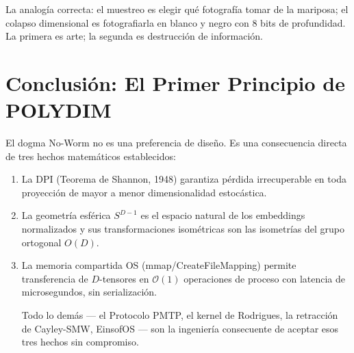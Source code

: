 La analogía correcta: el muestreo es elegir qué fotografía tomar de la mariposa;
el colapso dimensional es fotografiarla en blanco y negro con 8 bits de profundidad.
La primera es arte; la segunda es destrucción de información.

\section{Conclusión: El Primer Principio de POLYDIM}

El dogma No-Worm no es una preferencia de diseño. Es una consecuencia directa
de tres hechos matemáticos establecidos:

\begin{enumerate}
\item La DPI (Teorema de Shannon, 1948) garantiza pérdida irrecuperable en toda
proyección de mayor a menor dimensionalidad estocástica.

\item La geometría esférica $S^{D-1}$ es el espacio natural de los embeddings
normalizados y sus transformaciones isométricas son las isometrías del grupo
ortogonal $O(D)$.

\item La memoria compartida OS (mmap/CreateFileMapping) permite transferencia
de $D$-tensores en $\mathcal{O}(1)$ operaciones de proceso con latencia de
microsegundos, sin serialización.

Todo lo demás --- el Protocolo PMTP, el kernel de Rodrigues, la retracción
de Cayley-SMW, EinsofOS --- son la ingeniería consecuente de aceptar esos
tres hechos sin compromiso.
\end{enumerate}
